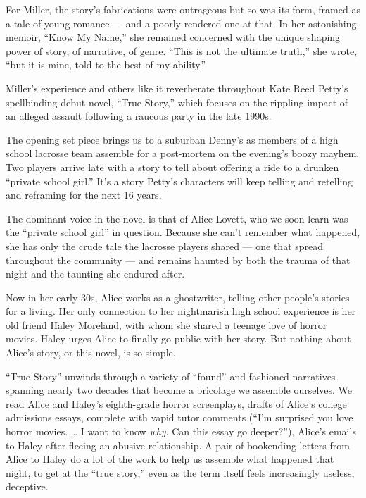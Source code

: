 For Miller, the story's fabrications were outrageous but so was its
form, framed as a tale of young romance --- and a poorly rendered one at
that. In her astonishing memoir,
``\href{https://www.nytimes3xbfgragh.onion/2019/09/24/books/review/chanel-miller-know-my-name.html}{Know
My Name,}'' she remained concerned with the unique shaping power of
story, of narrative, of genre. ``This is not the ultimate truth,'' she
wrote, ``but it is mine, told to the best of my ability.''

Miller's experience and others like it reverberate throughout Kate Reed
Petty's spellbinding debut novel, ``True Story,'' which focuses on the
rippling impact of an alleged assault following a raucous party in the
late 1990s.

The opening set piece brings us to a suburban Denny's as members of a
high school lacrosse team assemble for a post-mortem on the evening's
boozy mayhem. Two players arrive late with a story to tell about
offering a ride to a drunken ``private school girl.'' It's a story
Petty's characters will keep telling and retelling and reframing for the
next 16 years.

The dominant voice in the novel is that of Alice Lovett, who we soon
learn was the ``private school girl'' in question. Because she can't
remember what happened, she has only the crude tale the lacrosse players
shared --- one that spread throughout the community --- and remains
haunted by both the trauma of that night and the taunting she endured
after.

Now in her early 30s, Alice works as a ghostwriter, telling other
people's stories for a living. Her only connection to her nightmarish
high school experience is her old friend Haley Moreland, with whom she
shared a teenage love of horror movies. Haley urges Alice to finally go
public with her story. But nothing about Alice's story, or this novel,
is so simple.

``True Story'' unwinds through a variety of ``found'' and fashioned
narratives spanning nearly two decades that become a bricolage we
assemble ourselves. We read Alice and Haley's eighth-grade horror
screenplays, drafts of Alice's college admissions essays, complete with
vapid tutor comments (``I'm surprised you love horror movies. \ldots{} I
want to know \emph{why}. Can this essay go deeper?''), Alice's emails to
Haley after fleeing an abusive relationship. A pair of bookending
letters from Alice to Haley do a lot of the work to help us assemble
what happened that night, to get at the ``true story,'' even as the term
itself feels increasingly useless, deceptive.

